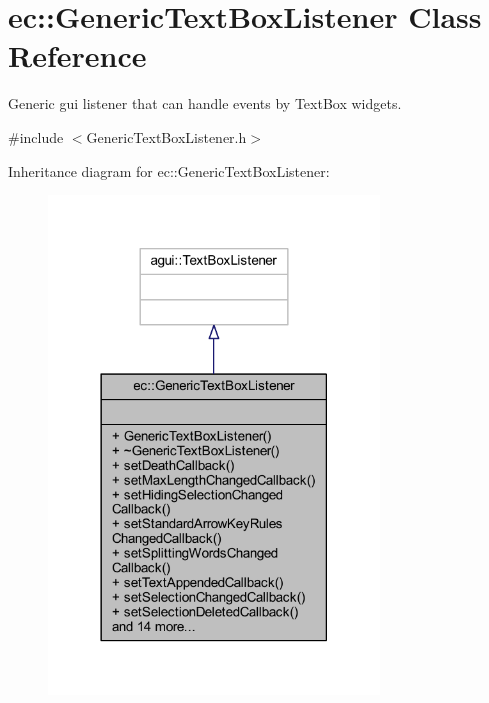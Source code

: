 \hypertarget{classec_1_1_generic_text_box_listener}{}\section{ec\+:\+:Generic\+Text\+Box\+Listener Class Reference}
\label{classec_1_1_generic_text_box_listener}


Generic gui listener that can handle events by Text\+Box widgets.  




{\ttfamily \#include $<$Generic\+Text\+Box\+Listener.\+h$>$}



Inheritance diagram for ec\+:\+:Generic\+Text\+Box\+Listener\+:\nopagebreak
\begin{figure}[H]
\begin{center}
\leavevmode
\includegraphics[width=249pt]{classec_1_1_generic_text_box_listener__inherit__graph}
\end{center}
\end{figure}


